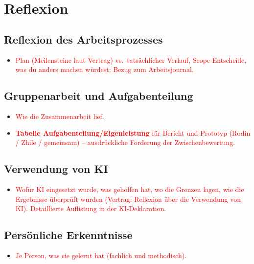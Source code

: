 \documentclass[../Main.tex]{subfiles}
\begin{document}
\section{Reflexion} \label{sec:Reflexion}

\subsection{Reflexion des Arbeitsprozesses}

\begin{itemize}[leftmargin=1.5cm]
    \item \textcolor{red}{Plan (Meilensteine laut Vertrag) vs.\ tatsächlicher Verlauf, Scope-Entscheide, was du anders machen würdest; Bezug zum Arbeitsjournal.}
\end{itemize}

\subsection{Gruppenarbeit und Aufgabenteilung}

\begin{itemize}[leftmargin=1.5cm]
    \item \textcolor{red}{Wie die Zusammenarbeit lief.}
    \item \textcolor{red}{\textbf{Tabelle Aufgabenteilung/Eigenleistung} für Bericht und Prototyp (Rodin / Zhile / gemeinsam) -- ausdrückliche Forderung der Zwischenbewertung.}
\end{itemize}

\subsection{Verwendung von KI} \label{sec:ReflexionKI}

\begin{itemize}[leftmargin=1.5cm]
    \item \textcolor{red}{Wofür KI eingesetzt wurde, was geholfen hat, wo die Grenzen lagen, wie die Ergebnisse überprüft wurden (Vertrag: Reflexion über die Verwendung von KI). Detaillierte Auflistung in der KI-Deklaration.}
\end{itemize}

\subsection{Persönliche Erkenntnisse}

\begin{itemize}[leftmargin=1.5cm]
    \item \textcolor{red}{Je Person, was sie gelernt hat (fachlich und methodisch).}
\end{itemize}
\end{document}
